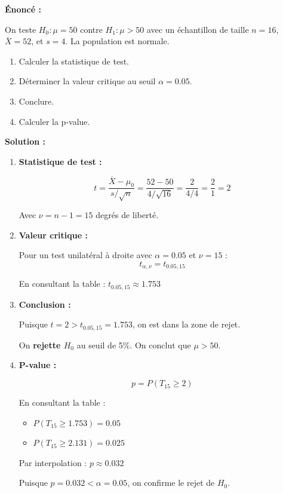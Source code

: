 \documentclass[11pt,a4paper]{article}
\begin{document}
\textbf{Énoncé :}

On teste $H_0 : \mu = 50$ contre $H_1 : \mu > 50$ avec un échantillon de taille $n = 16$, $\overline{X} = 52$, et $s = 4$. La population est normale.

\begin{enumerate}
    \item Calculer la statistique de test.
    \item Déterminer la valeur critique au seuil $\alpha = 0.05$.
    \item Conclure.
    \item Calculer la p-value.
\end{enumerate}

\textbf{Solution :}

\begin{enumerate}
    \item \textbf{Statistique de test :}
    
    $$t = \frac{\overline{X} - \mu_0}{s/\sqrt{n}} = \frac{52 - 50}{4/\sqrt{16}} = \frac{2}{4/4} = \frac{2}{1} = 2$$
    
    Avec $\nu = n - 1 = 15$ degrés de liberté.
    
    \item \textbf{Valeur critique :}
    
    Pour un test unilatéral à droite avec $\alpha = 0.05$ et $\nu = 15$ :
    $$t_{\alpha, \nu} = t_{0.05, 15}$$
    
    En consultant la table : $t_{0.05, 15} \approx 1.753$
    
    \item \textbf{Conclusion :}
    
    Puisque $t = 2 > t_{0.05, 15} = 1.753$, on est dans la zone de rejet.
    
    On \textbf{rejette $H_0$} au seuil de 5\%. On conclut que $\mu > 50$.
    
    \item \textbf{P-value :}
    
    $$p = P(T_{15} \geq 2)$$
    
    En consultant la table :
    \begin{itemize}
        \item $P(T_{15} \geq 1.753) = 0.05$
        \item $P(T_{15} \geq 2.131) = 0.025$
    \end{itemize}
    
    Par interpolation : $p \approx 0.032$
    
    Puisque $p = 0.032 < \alpha = 0.05$, on confirme le rejet de $H_0$.
\end{enumerate}
\end{document}
